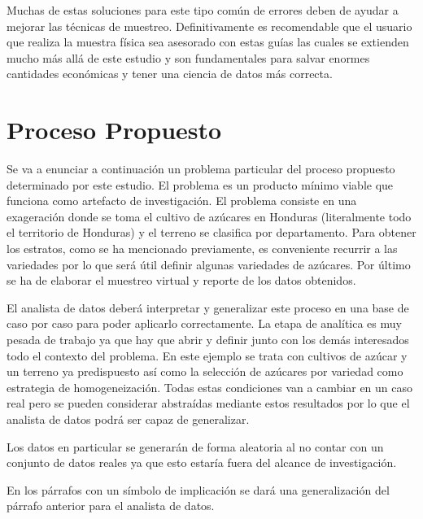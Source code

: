 \documentclass[conference]{IEEEtran}
\begin{document}
Muchas de estas soluciones para este tipo común de errores deben de ayudar a mejorar las técnicas de muestreo. Definitivamente es recomendable que el usuario que realiza la muestra física sea asesorado con estas guías las cuales se extienden mucho más allá de este estudio y son fundamentales para salvar enormes cantidades económicas y tener una ciencia de datos más correcta.





\section{Proceso Propuesto}

Se va a enunciar a continuación un problema particular del proceso propuesto determinado por este estudio. El problema es un producto mínimo viable que funciona como artefacto de investigación. El problema consiste en una exageración donde se toma el cultivo de azúcares en Honduras (literalmente todo el territorio de Honduras) y el terreno se clasifica por departamento. Para obtener los estratos, como se ha mencionado previamente, es conveniente recurrir a las variedades por lo que será útil definir algunas variedades de azúcares. Por último se ha de elaborar el muestreo virtual y reporte de los datos obtenidos.

\bigbreak

El analista de datos deberá interpretar y generalizar este proceso en una base de caso por caso para poder aplicarlo correctamente. La etapa de analítica es muy pesada de trabajo ya que hay que abrir y definir junto con los demás interesados todo el contexto del problema. En este ejemplo se trata con cultivos de azúcar y un terreno ya predispuesto así como la selección de azúcares por variedad como estrategia de homogeneización. Todas estas condiciones van a cambiar en un caso real pero se pueden considerar abstraídas mediante estos resultados por lo que el analista de datos podrá ser capaz de generalizar.

\bigbreak

Los datos en particular se generarán de forma aleatoria al no contar con un conjunto de datos reales ya que esto estaría fuera del alcance de investigación.

\bigbreak

En los párrafos con un símbolo de implicación se dará una generalización del párrafo anterior para el analista de datos.
\end{document}
